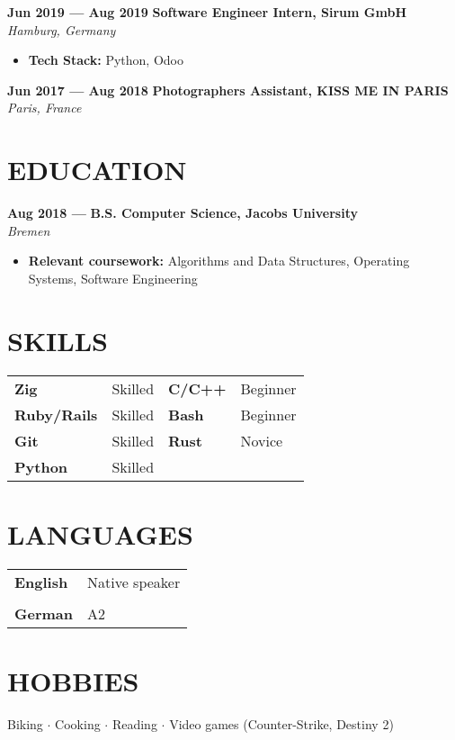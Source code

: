 \documentclass[11pt,a4paper]{article}
\newcommand{\resumesection}[1]{
  \section*{\textcolor{sectioncolor}{\MakeUppercase{#1}}}
}
\newcommand{\skill}[2]{
  \textbf{#1} & #2 \\
}
\newcommand{\job}[4]{
  \textbf{#1 — #2} \hfill \textbf{#3} \\
  \textit{#4}
}
\begin{document}
\job{Jun 2019} {Aug 2019} {Software Engineer Intern, Sirum GmbH} {Hamburg, Germany}
\begin{itemize}[leftmargin=*,label=$\bullet$,itemsep=0.3ex]
    \item \textbf{Tech Stack:} Python, Odoo
\end{itemize}

\job{Jun 2017} {Aug 2018} {Photographers Assistant, KISS ME IN PARIS} {Paris, France}

\resumesection{Education}
\job{Aug 2018} {} {B.S. Computer Science, Jacobs University} {Bremen}
\begin{itemize}[leftmargin=*,itemsep=0.3ex]
  \item \textbf{Relevant coursework:} Algorithms and Data Structures, Operating Systems, Software Engineering
\end{itemize}

\resumesection{Skills}
\begin{tabular}{p{}p{}p{}p{}}
  \textbf{Zig} & Skilled & \textbf{C/C++} & Beginner \\
  \textbf{Ruby/Rails} & Skilled & \textbf{Bash} & Beginner \\
  \textbf{Git} & Skilled & \textbf{Rust} & Novice \\
  \textbf{Python} & Skilled & \\
\end{tabular}

\resumesection{Languages}
\begin{tabular}{ll}
  \skill{English} {Native speaker} \\
  \skill{German} {A2}
\end{tabular}

\resumesection{Hobbies}
Biking $\cdot$
Cooking $\cdot$
Reading $\cdot$
Video games (Counter-Strike, Destiny 2)
\end{document}
